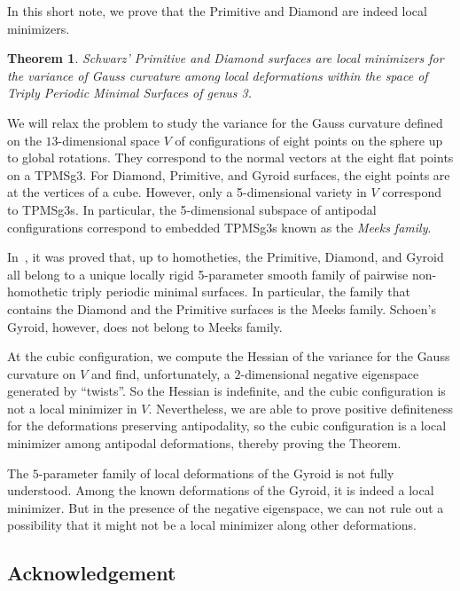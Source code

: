 \documentclass[a4paper]{amsart}
\theoremstyle{plain} %
\newtheorem*{theorem}{Theorem}
\theoremstyle{definition} %
\theoremstyle{remark}
\begin{document}
In this short note, we prove that the Primitive and Diamond are indeed local
minimizers.

\begin{theorem} \label{thm:main}
	Schwarz' Primitive and Diamond surfaces are local minimizers for the variance
	of Gauss curvature among local deformations within the space of Triply
	Periodic Minimal Surfaces of genus 3.
\end{theorem}

We will relax the problem to study the variance for the Gauss curvature defined
on the $13$-dimensional space $V$ of configurations of eight points on the
sphere up to global rotations.  They correspond to the normal vectors at the
eight flat points on a TPMSg3.  For Diamond, Primitive, and Gyroid surfaces,
the eight points are at the vertices of a cube.  However, only a 5-dimensional
variety in $V$ correspond to TPMSg3s.  In particular, the 5-dimensional
subspace of antipodal configurations correspond to embedded TPMSg3s known as
the \emph{Meeks family}.

In~\cite{koiso2018}, it was proved that, up to homotheties, the Primitive,
Diamond, and Gyroid all belong to a unique locally rigid 5-parameter smooth
family of pairwise non-homothetic triply periodic minimal surfaces.  In
particular, the family that contains the Diamond and the Primitive surfaces is
the Meeks family.  Schoen's Gyroid, however, does not belong to Meeks family.

At the cubic configuration, we compute the Hessian of the variance for the
Gauss curvature on $V$ and find, unfortunately, a $2$-dimensional negative
eigenspace generated by ``twists''.  So the Hessian is indefinite, and the
cubic configuration is not a local minimizer in $V$.  Nevertheless, we are able
to prove positive definiteness for the deformations preserving antipodality, so
the cubic configuration is a local minimizer among antipodal deformations,
thereby proving the Theorem.

The $5$-parameter family of local deformations of the Gyroid is not fully
understood.  Among the known deformations of the Gyroid, it is indeed a local
minimizer.  But in the presence of the negative eigenspace, we can not rule out
a possibility that it might not be a local minimizer along other deformations.

\subsection*{Acknowledgement}
\end{document}
